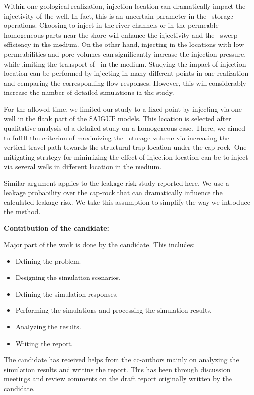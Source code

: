 {Within one geological realization, injection location can dramatically impact the injectivity of the well. In fact, this is an uncertain parameter in the \coo\ storage operations. Choosing to inject in the river channels or in the permeable homogeneous parts near the shore will enhance the injectivity and the \coo\ sweep efficiency in the medium. On the other hand, injecting in the locations with low permeabilities and pore-volumes can significantly increase the injection pressure, while limiting the transport of \coo\ in the medium. Studying the impact of injection location can be performed by injecting in many different points in one realization and comparing the corresponding flow responses. However, this will considerably increase the number of detailed simulations in the study. 

For the allowed time, we limited our study to a fixed point by injecting via one well in the flank part of the SAIGUP models. This location is selected after qualitative analysis of a detailed study on a homogeneous case. There, we aimed to fulfill the criterion of maximizing the \coo\ storage volume via increasing the vertical travel path towards the structural trap location under the cap-rock. One mitigating strategy for minimizing the effect of injection location can be to inject via several wells in different location in the medium.  

Similar argument applies to the leakage risk study reported here. We use a leakage probability over the cap-rock that can dramatically influence the calculated leakage risk. We take this assumption to simplify the way we introduce the method. 

\vspace{0.5cm}
\noindent\textbf{Contribution of the candidate:}

Major part of the work is done by the candidate. This includes:
\begin{itemize}
\item Defining the problem.
\item Designing the simulation scenarios.
\item Defining the simulation responses.
\item Performing the simulations  and processing the simulation results.
\item Analyzing the results.
\item Writing the report.
\end{itemize}

The candidate has received helps from the co-authors mainly on analyzing the simulation  results and writing the report. This has been through discussion meetings and review comments on the draft report originally written by the candidate.  

}%


